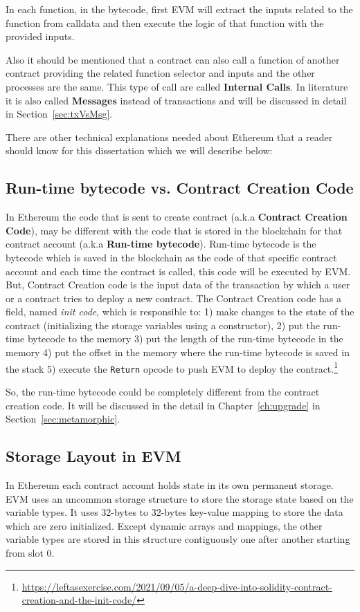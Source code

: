 In each function, in the bytecode, first EVM will extract the inputs related to the function from calldata and then execute the logic of that function with the provided inputs.

Also it should be mentioned that a contract can also call a function of another contract providing the related function selector and inputs and the other processes are the same. This type of call are called \textbf{Internal Calls}. In literature it is also called \textbf{Messages} instead of transactions and will be discussed in detail in Section~\ref{sec:txVsMsg}.

There are other technical explanations needed about Ethereum that a reader should know for this dissertation which we will describe below:

\subsection{Run-time bytecode vs. Contract Creation Code}
In Ethereum the code that is sent to create contract (a.k.a \textbf{Contract Creation Code}), may be different with the code that is stored in the blockchain for that contract account (a.k.a \textbf{Run-time bytecode}). Run-time bytecode is the bytecode which is saved in the blockchain as the code of that specific contract account and each time the contract is called, this code will be executed by EVM. But, Contract Creation code is the input data of the transaction by which a user or a contract tries to deploy a new contract. The Contract Creation code has a field, named \textit{init code}, which is responsible to: 1) make changes to the state of the contract (initializing the storage variables using a constructor), 2) put the run-time bytecode to the memory 3) put the length of the run-time bytecode in the memory 4) put the offset in the memory where the run-time bytecode is saved in the stack 5) execute the \texttt{Return} opcode to push EVM to deploy the contract.\footnote{\url{https://leftasexercise.com/2021/09/05/a-deep-dive-into-solidity-contract-creation-and-the-init-code/}} 

So, the run-time bytecode could be completely different from the contract creation code. It will be discussed in the detail in Chapter~\ref{ch:upgrade} in Section~\ref{sec:metamorphic}.

\subsection{Storage Layout in EVM} \label{sec:storagelayout}
In Ethereum each contract account holds state in its own permanent storage. EVM uses an uncommon storage structure to store the storage state based on the variable types. It uses 32-bytes to 32-bytes key-value mapping to store the data which are zero initialized. Except dynamic arrays and mappings, the other variable types are stored in this structure contiguously one after another starting from slot 0. 

